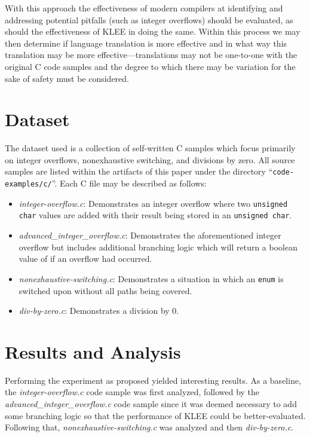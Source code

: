 \documentclass[conference]{IEEEtran}
\begin{document}
With this approach the effectiveness of modern compilers at identifying and
addressing potential pitfalls (such as integer overflows) should be evaluated, as
should the effectiveness of KLEE in doing the same. Within this process we may then
determine if language translation is more effective and in what way this translation
may be more effective---translations may not be one-to-one with the original C code
samples and the degree to which there may be variation for the sake of safety must
be considered.


\section{Dataset}
The dataset used is a collection of self-written C samples which focus primarily on
integer overflows, nonexhaustive switching, and divisions by zero. All source samples
are listed within the artifacts of this paper under the directory
``\texttt{code-examples/c/}''. Each C file may be described as follows:
\begin{itemize}
    \item \textit{integer-overflow.c}: Demonstrates an integer overflow where two
        \texttt{unsigned char} values are added with their result being stored in an
        \texttt{unsigned char}.
    \item \textit{advanced\_integer\_overflow.c}: Demonstrates the aforementioned
        integer overflow but includes additional branching logic which will return a
        boolean value of if an overflow had occurred.
    \item \textit{nonexhaustive-switching.c}: Demonstrates a situation in which an
        \texttt{enum} is switched upon without all paths being covered.
    \item \textit{div-by-zero.c}: Demonstrates a division by 0.
\end{itemize}


\section{Results and Analysis}
Performing the experiment as proposed yielded interesting results. As a baseline, the
\textit{integer-overflow.c} code sample was first analyzed, followed by the
\textit{advanced\_integer\_overflow.c} code sample since it was deemed necessary to
add some branching logic so that the performance of KLEE could be better-evaluated.
Following that, \textit{nonexhaustive-switching.c} was analyzed and then
\textit{div-by-zero.c}.
\end{document}
